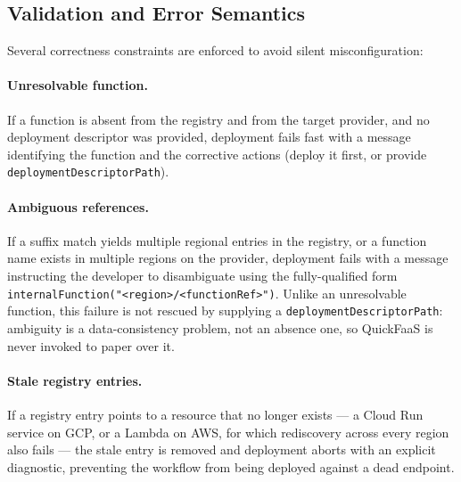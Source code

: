 \subsection{Validation and Error Semantics}
\label{subsec:validation-error-semantics}
Several correctness constraints are enforced to avoid silent misconfiguration:

\paragraph{Unresolvable function.}
If a function is absent from the registry and from the target provider, and no deployment
descriptor was provided, deployment fails fast with a message identifying the function and
the corrective actions (deploy it first, or provide \texttt{deploymentDescriptorPath}).

\paragraph{Ambiguous references.}
If a suffix match yields multiple regional entries in the registry, or a function name
exists in multiple regions on the provider, deployment fails with a message instructing the
developer to disambiguate using the fully-qualified form
\texttt{internalFunction("<region>/<functionRef>")}. Unlike an unresolvable function, this
failure is not rescued by supplying a \texttt{deploymentDescriptorPath}: ambiguity is a
data-consistency problem, not an absence one, so QuickFaaS is never invoked to paper over it.

\paragraph{Stale registry entries.}
If a registry entry points to a resource that no longer exists --- a Cloud Run service on GCP, or
a Lambda on AWS, for which rediscovery across every region also fails --- the stale entry is
removed and deployment aborts with an explicit diagnostic, preventing the workflow from being
deployed against a dead endpoint.

